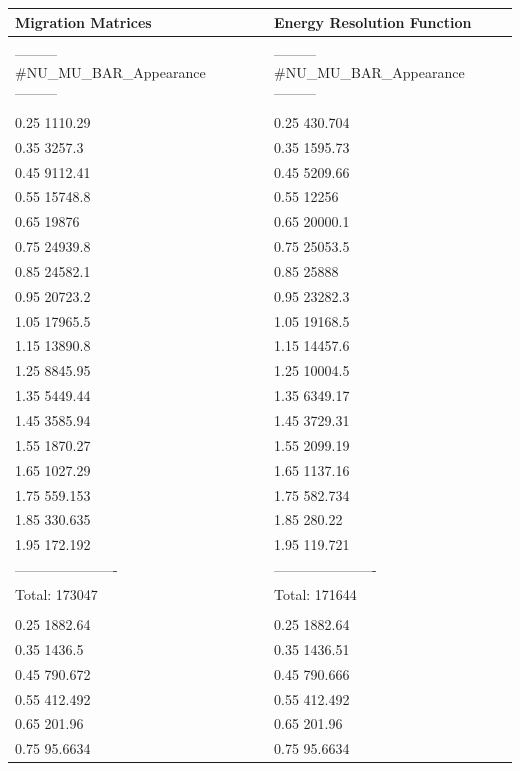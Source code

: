 \documentclass[12pt,a4paper]{article}
\theoremstyle{dotless}
\begin{document}
\begin{appendix}
\begin {center}
\begin{tabular}{lcl}
{\large Migration Matrices} && {\large Energy Resolution Function} \\ \hline && \\ 
--------- \#NU\_MU\_BAR\_Appearance ---------&&--------- \#NU\_MU\_BAR\_Appearance ---------\\
&&\\
  0.25       1110.29&&  0.25       430.704\\
  0.35        3257.3&&  0.35       1595.73\\
  0.45       9112.41&&  0.45       5209.66\\
  0.55       15748.8&&  0.55         12256\\
  0.65         19876&&  0.65       20000.1\\
  0.75       24939.8&&  0.75       25053.5\\
  0.85       24582.1&&  0.85         25888\\
  0.95       20723.2&&  0.95       23282.3\\
  1.05       17965.5&&  1.05       19168.5\\
  1.15       13890.8&&  1.15       14457.6\\
  1.25       8845.95&&  1.25       10004.5\\
  1.35       5449.44&&  1.35       6349.17\\
  1.45       3585.94&&  1.45       3729.31\\
  1.55       1870.27&&  1.55       2099.19\\
  1.65       1027.29&&  1.65       1137.16\\
  1.75       559.153&&  1.75       582.734\\
  1.85       330.635&&  1.85        280.22\\
  1.95       172.192&&  1.95       119.721\\
----------------------&&----------------------\\
Total:        173047&&Total:        171644\\
&&\\
  0.25       1882.64&&  0.25       1882.64\\
  0.35        1436.5&&  0.35       1436.51\\
  0.45       790.672&&  0.45       790.666\\
  0.55       412.492&&  0.55       412.492\\
  0.65        201.96&&  0.65        201.96\\
  0.75       95.6634&&  0.75       95.6634\\

\end{tabular}
\end{center}
\end{appendix}
\end{document}
